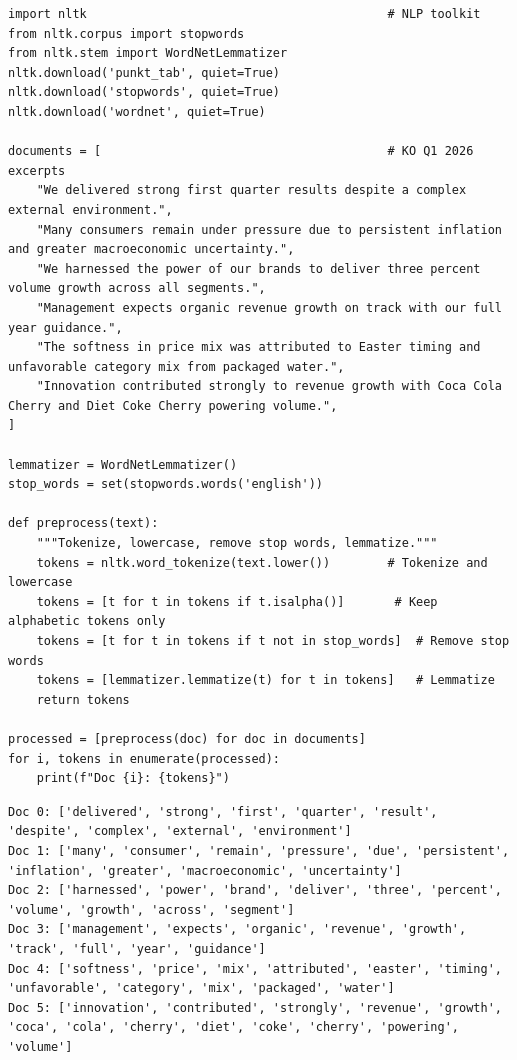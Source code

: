 \begin{verbatim}
import nltk                                          # NLP toolkit
from nltk.corpus import stopwords
from nltk.stem import WordNetLemmatizer
nltk.download('punkt_tab', quiet=True)
nltk.download('stopwords', quiet=True)
nltk.download('wordnet', quiet=True)

documents = [                                        # KO Q1 2026 excerpts
    "We delivered strong first quarter results despite a complex external environment.",
    "Many consumers remain under pressure due to persistent inflation and greater macroeconomic uncertainty.",
    "We harnessed the power of our brands to deliver three percent volume growth across all segments.",
    "Management expects organic revenue growth on track with our full year guidance.",
    "The softness in price mix was attributed to Easter timing and unfavorable category mix from packaged water.",
    "Innovation contributed strongly to revenue growth with Coca Cola Cherry and Diet Coke Cherry powering volume.",
]

lemmatizer = WordNetLemmatizer()
stop_words = set(stopwords.words('english'))

def preprocess(text):
    """Tokenize, lowercase, remove stop words, lemmatize."""
    tokens = nltk.word_tokenize(text.lower())        # Tokenize and lowercase
    tokens = [t for t in tokens if t.isalpha()]       # Keep alphabetic tokens only
    tokens = [t for t in tokens if t not in stop_words]  # Remove stop words
    tokens = [lemmatizer.lemmatize(t) for t in tokens]   # Lemmatize
    return tokens

processed = [preprocess(doc) for doc in documents]
for i, tokens in enumerate(processed):
    print(f"Doc {i}: {tokens}")
\end{verbatim}

\begin{verbatim}
Doc 0: ['delivered', 'strong', 'first', 'quarter', 'result', 'despite', 'complex', 'external', 'environment']
Doc 1: ['many', 'consumer', 'remain', 'pressure', 'due', 'persistent', 'inflation', 'greater', 'macroeconomic', 'uncertainty']
Doc 2: ['harnessed', 'power', 'brand', 'deliver', 'three', 'percent', 'volume', 'growth', 'across', 'segment']
Doc 3: ['management', 'expects', 'organic', 'revenue', 'growth', 'track', 'full', 'year', 'guidance']
Doc 4: ['softness', 'price', 'mix', 'attributed', 'easter', 'timing', 'unfavorable', 'category', 'mix', 'packaged', 'water']
Doc 5: ['innovation', 'contributed', 'strongly', 'revenue', 'growth', 'coca', 'cola', 'cherry', 'diet', 'coke', 'cherry', 'powering', 'volume']
\end{verbatim}

